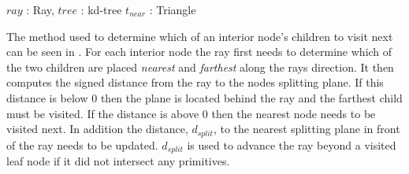 \begin{algorithm}
  \caption{A general kd-tree traversal algorithm for ray tracing}
  \label{alg:generalTracing}
  \begin{algorithmic}
              {$ray$ : Ray, $tree$ : kd-tree}
              {$t_{near}$ : Triangle}{
                  \ELSE
                  \ENDIF
                \ENDWHILE
              }
  \end{algorithmic}
\end{algorithm}


The method used to determine which of an interior node's children to visit next
can be seen in . For each interior node the ray
first needs to determine which of the two children are placed \textit{nearest}
and \textit{farthest} along the rays direction. It then computes the signed
distance from the ray to the nodes splitting plane. If this distance is below 0
then the plane is located behind the ray and the farthest child must be
visited. If the distance is above 0 then the nearest node needs to be visited
next. In addition the distance, $d_{split}$, to the nearest splitting plane in
front of the ray needs to be updated. $d_{split}$ is used to advance the ray
beyond a visited leaf node if it did not intersect any primitives.

